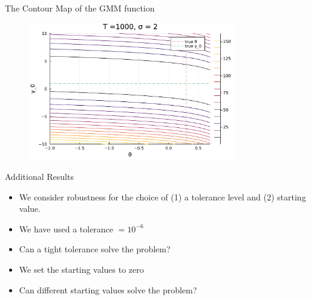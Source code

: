 \documentclass[aspectratio = 169]{beamer}
\theoremstyle{definition}
\begin{document}
\begin{frame}{The Contour Map of the GMM function}
    \begin{figure}
        \centering
        \includegraphics[width = 9cm]{figuretable/contour_loglinear_loglinear_n_1000_sigma_2.pdf}
        \label{fig:contour_map}
    \end{figure}
\end{frame}

\begin{frame}{Additional Results}
    \begin{itemize}
        \item We consider robustness for the choice of (1) a tolerance level and (2) starting value.
        \item We have used a tolerance $ = 10^{-6}$
        \item Can a tight tolerance solve the problem?
        \item We set the starting values to zero
        \item Can different starting values solve the problem?
    \end{itemize}
\end{frame}
\end{document}
